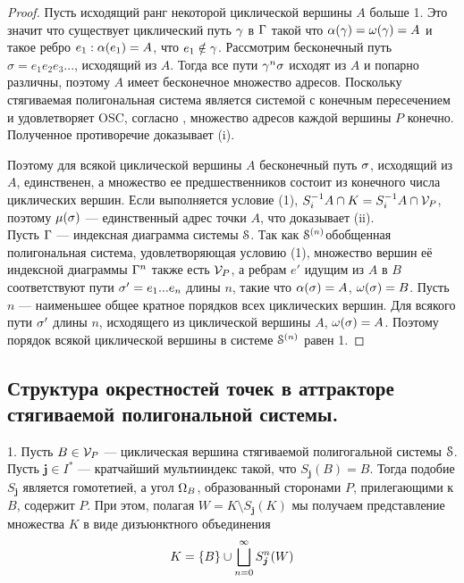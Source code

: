 \begin{proof}
Пусть исходящий ранг некоторой циклической вершины $A$ больше 1. 
Это значит что существует циклический путь $\gamma$ в $\Gamma$ такой что $\alpha(\gamma)=\omega(\gamma)=A$  и такое ребро $e_1: \alpha(e_1)=A$, что $e_1\notin\gamma$. 
Рассмотрим бесконечный путь $\sigma=e_1 e_2 e_3...$, исходящий из $A$. 
Тогда все пути $\gamma^n\sigma$ исходят из $A$ и попарно различны, поэтому $A$ имеет бесконечное множество адресов. 
Поскольку стягиваемая полигональная система является системой с конечным пересечением и удовлетворяет OSC, согласно \cite[Theorem 1.7]{FPS}, множество адресов каждой вершины $P$ конечно. 
Полученное противоречие доказывает (i).
 
Поэтому для всякой циклической вершины $A$ бесконечный путь $\sigma$, исходящий из $A$,  единственен, а множество ее предшественников состоит из конечного числа циклических вершин. 
Если выполняется условие (1), $S_i^{-1}A\cap K=S_i^{-1}A\cap {\mathcal V}_P$, поэтому $\mu(\sigma)$ --- единственный адрес точки $A$, что доказывает (ii).\\

Пусть $\Gamma$ --- индексная диаграмма системы ${\EuScript S}$. 
Так как
${\EuScript S}^{(n)}$обобщенная полигональная система, удовлетворяющая  условию (1), множество  вершин её индексной диаграммы $\Gamma^n$ также есть   ${\mathcal V}_P$,  а ребрам $e'$ идущим из $A$
в $B$ соответствуют пути $\sigma'=e_1...e_n$ длины $n$, такие что $\alpha(\sigma)=A$, $\omega(\sigma)=B$.
Пусть $n$ --- наименьшее общее кратное порядков всех циклических вершин. 
Для всякого пути $\sigma'$ длины $n$, исходящего из циклической вершины $A$, $\omega(\sigma)=A$. 
Поэтому порядок всякой циклической вершины в системе ${\EuScript S}^{(n)}$ равен 1.
\end{proof}


\subsection{Структура окрестностей точек в аттракторе стягиваемой полигональной системы.}

1. Пусть  $B\in{\mathcal V}_P$ --- циклическая вершина стягиваемой полигогальной системы ${\EuScript S}$. 
Пусть $\bm{j}\in I^*$ --- кратчайший мультииндекс  такой, что $S_{\bm{j}}(B)=B$. 
Тогда подобие $S_{\bm{j}}$ является гомотетией, а угол $\Omega_B$, образованный сторонами $P$, прилегающими к $B$, содержит $P$. 
При этом, полагая $W=K\setminus S_{\bm{j}}(K)$ мы получаем представление множества $K$  в виде дизъюнктного объединения 
\begin{equation}\label{wprc}
 K=\{B\}\cup\bigsqcup\limits_{n=0}^\infty S_{{\bm{j}}}^n(W)   
\end{equation}

